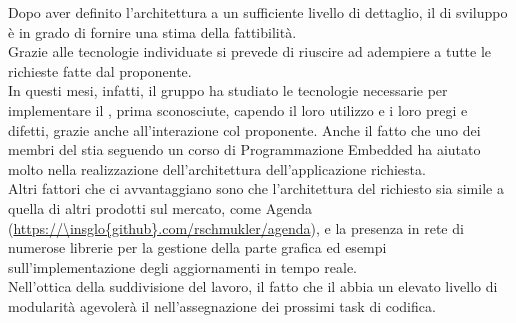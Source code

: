 Dopo aver definito l'architettura a un sufficiente livello di dettaglio, il  di sviluppo è in grado di fornire una stima della fattibilità.\\
Grazie alle tecnologie individuate si prevede di riuscire ad adempiere a tutte le richieste fatte dal proponente.\\
In questi mesi, infatti, il gruppo ha studiato le tecnologie necessarie per implementare il , prima sconosciute, capendo il loro utilizzo e i loro pregi e difetti, grazie anche all'interazione col proponente. Anche il fatto che uno dei membri del  stia seguendo un corso di Programmazione Embedded ha aiutato molto nella realizzazione dell'architettura dell'applicazione  richiesta. \\
Altri fattori che ci avvantaggiano sono che l'architettura del  richiesto sia simile a quella di altri prodotti sul mercato, come Agenda (\url{https://\insglo{github}.com/rschmukler/agenda}), e la presenza in rete di numerose librerie per la gestione della parte grafica ed esempi sull'implementazione degli aggiornamenti in tempo reale.\\
Nell'ottica della suddivisione del lavoro, il fatto che il  abbia un elevato livello di modularità agevolerà il  nell'assegnazione dei prossimi task di codifica.\\
